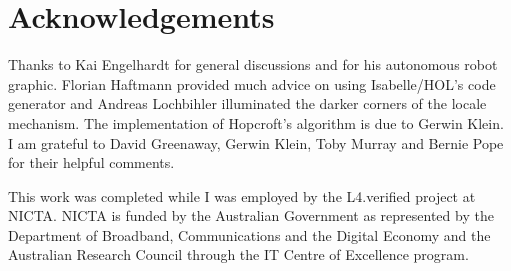 \documentclass{article}
\begin{document}
\section{Acknowledgements}

Thanks to Kai Engelhardt for general discussions and for his
autonomous robot graphic. Florian Haftmann provided much advice on
using Isabelle/HOL's code generator and Andreas Lochbihler illuminated
the darker corners of the locale mechanism. The implementation of
Hopcroft's algorithm is due to Gerwin Klein. I am grateful to David
Greenaway, Gerwin Klein, Toby Murray and Bernie Pope for their helpful
comments.

This work was completed while I was employed by the L4.verified
project at NICTA. NICTA is funded by the Australian Government as
represented by the Department of Broadband, Communications and the
Digital Economy and the Australian Research Council through the IT
Centre of Excellence program.



\end{document}

